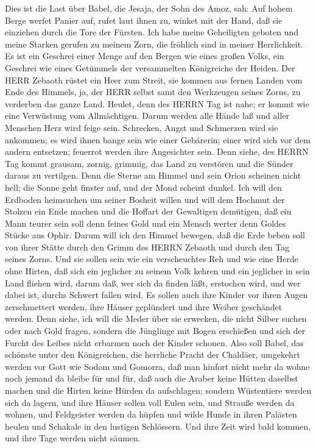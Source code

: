  Dies ist die Last über Babel, die Jesaja, der Sohn des
Amoz, sah:  Auf hohem Berge werfet Panier auf, rufet laut
ihnen zu, winket mit der Hand, daß sie einziehen durch die Tore der
Fürsten.  Ich habe meine Geheiligten geboten und meine
Starken gerufen zu meinem Zorn, die fröhlich sind in meiner
Herrlichkeit.  Es ist ein Geschrei einer Menge auf den
Bergen wie eines großen Volks, ein Geschrei wie eines Getümmels der
versammelten Königreiche der Heiden. Der HERR Zebaoth rüstet ein Heer
zum Streit,  sie kommen aus fernen Landen vom Ende des
Himmels, ja, der HERR selbst samt den Werkzeugen seines Zorns, zu
verderben das ganze Land.  Heulet, denn des HERRN Tag ist
nahe; er kommt wie eine Verwüstung vom Allmächtigen.  Darum
werden alle Hände laß und aller Menschen Herz wird feige sein.
 Schrecken, Angst und Schmerzen wird sie ankommen; es wird
ihnen bange sein wie einer Gebärerin; einer wird sich vor dem andern
entsetzen; feuerrot werden ihre Angesichter sein.  Denn
siehe, des HERRN Tag kommt grausam, zornig, grimmig, das Land zu
verstören und die Sünder daraus zu vertilgen.  Denn die
Sterne am Himmel und sein Orion scheinen nicht hell; die Sonne geht
finster auf, und der Mond scheint dunkel.  Ich will den
Erdboden heimsuchen um seiner Bosheit willen und will dem Hochmut der
Stolzen ein Ende machen und die Hoffart der Gewaltigen demütigen,
 daß ein Mann teurer sein soll denn feines Gold und ein
Mensch werter denn Goldes Stücke aus Ophir.  Darum will ich
den Himmel bewegen, daß die Erde beben soll von ihrer Stätte durch den
Grimm des HERRN Zebaoth und durch den Tag seines Zorns. 
Und sie sollen sein wie ein verscheuchtes Reh und wie eine Herde ohne
Hirten, daß sich ein jeglicher zu seinem Volk kehren und ein jeglicher
in sein Land fliehen wird,  darum daß, wer sich da finden
läßt, erstochen wird, und wer dabei ist, durchs Schwert fallen wird.
 Es sollen auch ihre Kinder vor ihren Augen zerschmettert
werden, ihre Häuser geplündert und ihre Weiber geschändet werden.
 Denn siehe, ich will die Meder über sie erwecken, die
nicht Silber suchen oder nach Gold fragen,  sondern die
Jünglinge mit Bogen erschießen und sich der Furcht des Leibes nicht
erbarmen noch der Kinder schonen.  Also soll Babel, das
schönste unter den Königreichen, die herrliche Pracht der Chaldäer,
umgekehrt werden vor Gott wie Sodom und Gomorra,  daß man
hinfort nicht mehr da wohne noch jemand da bleibe für und für, daß auch
die Araber keine Hütten daselbst machen und die Hirten keine Hürden da
aufschlagen;  sondern Wüstentiere werden sich da lagern,
und ihre Häuser sollen voll Eulen sein, und Strauße werden da wohnen,
und Feldgeister werden da hüpfen  und wilde Hunde in ihren
Palästen heulen und Schakale in den lustigen Schlössern. Und ihre Zeit
wird bald kommen, und ihre Tage werden nicht säumen.

